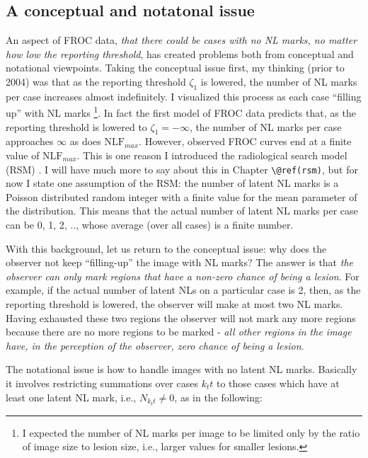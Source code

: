 \documentclass[
]{book}
\begin{document}
\hypertarget{empirical-indexing-marks}{%
\subsection{A conceptual and notatonal issue}\label{empirical-indexing-marks}}

An aspect of FROC data, \emph{that there could be cases with no NL marks, no matter how low the reporting threshold}, has created problems both from conceptual and notational viewpoints. Taking the conceptual issue first, my thinking (prior to 2004) was that as the reporting threshold \(\zeta_1\) is lowered, the number of NL marks per case increases almost indefinitely. I visualized this process as each case ``filling up'' with NL marks \footnote{I expected the number of NL marks per image to be limited only by the ratio of image size to lesion size, i.e., larger values for smaller lesions.}. In fact the first model of FROC data \citep{chakraborty1989maximum} predicts that, as the reporting threshold is lowered to \(\zeta_1 = -\infty\), the number of NL marks per case approaches \(\infty\) as does \(\text{NLF}_{max}\). However, observed FROC curves end at a finite value of \(\text{NLF}_{max}\). This is one reason I introduced the radiological search model (RSM) \citep{chakraborty2006search}. I will have much more to say about this in Chapter \texttt{\textbackslash{}@ref(rsm)}, but for now I state one assumption of the RSM: the number of latent NL marks is a Poisson distributed random integer with a finite value for the mean parameter of the distribution. This means that the actual number of latent NL marks per case can be 0, 1, 2, .., whose average (over all cases) is a finite number.

With this background, let us return to the conceptual issue: why does the observer not keep ``filling-up'' the image with NL marks? The answer is that \emph{the observer can only mark regions that have a non-zero chance of being a lesion}. For example, if the actual number of latent NLs on a particular case is 2, then, as the reporting threshold is lowered, the observer will make at most two NL marks. Having exhausted these two regions the observer will not mark any more regions because there are no more regions to be marked - \emph{all other regions in the image have, in the perception of the observer, zero chance of being a lesion}.

The notational issue is how to handle images with no latent NL marks. Basically it involves restricting summations over cases \(k_ t t\) to those cases which have at least one latent NL mark, i.e., \(N_{k_t t} \neq 0\), as in the following:
\end{document}
